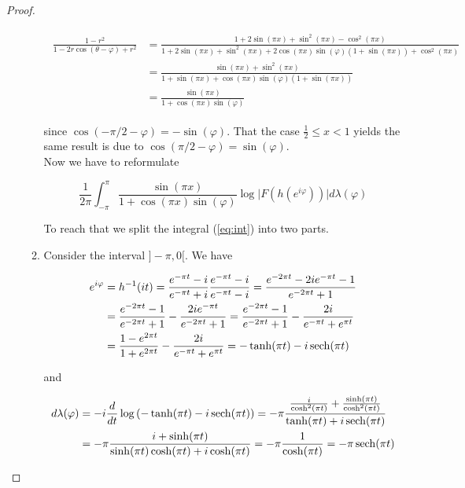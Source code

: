 \begin{proof}
\begin{enumerate}[label = \textbf{(\roman*)}]
\begin{enumerate}[label = \textbf{\alph*.}]
	\begin{gather*}
		\begin{aligned}
			\frac{1 - r^2}{1 - 2r\cos(\theta - \varphi) + r^2} &= \frac{1 + 2\sin(\pi x) + \sin^2(\pi x) - \cos^2(\pi x)}{1 + 2\sin(\pi x) + \sin^2(\pi x) + 2\cos(\pi x)\sin(\varphi)(1 + \sin(\pi x)) + \cos^2(\pi x)}\\
			&= \frac{\sin(\pi x) + \sin^2(\pi x)}{1 + \sin(\pi x) + \cos(\pi x)\sin(\varphi)(1 + \sin(\pi x))}\\
			&= \frac{\sin(\pi x)}{1 + \cos(\pi x)\sin(\varphi)}
		\end{aligned}
	\end{gather*}

	since $\cos\left( -\pi/2 - \varphi \right) = -\sin(\varphi)$. That the case $\frac{1}{2} \leqslant x < 1$ yields the same result is due to $\cos(\pi/2 - \varphi) = \sin(\varphi)$.\\
	Now we have to reformulate 

	\begin{equation}
		\frac{1}{2\pi} \int_{-\pi}^\pi \frac{\sin(\pi x)}{1 + \cos(\pi x)\sin(\varphi)} \log \vert F(h(e^{i\varphi}))\vert d\lambda(\varphi)
		\label{eq:int}
	\end{equation}

	To reach that we split the integral (\ref{eq:int}) into two parts. 

	\item Consider the interval $]-\pi,0[$. We have

				\begin{gather*}
					\begin{aligned}
						e^{i\varphi} &= h^{-1}(it) = \frac{e^{-\pi t} - i}{e^{-\pi t} + i} \frac{e^{-\pi t} - i}{e^{-\pi t} - i} = \frac{e^{-2\pi t} - 2ie^{-\pi t} - 1}{e^{-2\pi t} + 1}\\
						&= \frac{e^{-2\pi t} - 1}{e^{-2\pi t} + 1} - \frac{2ie^{-\pi t}}{e^{-2\pi t} + 1} = \frac{e^{-2\pi t} - 1}{e^{-2\pi t} + 1} - \frac{2i}{e^{-\pi t} + e^{\pi t}}\\
						&= \frac{1 - e^{2\pi t}}{1 + e^{2\pi t}} - \frac{2i}{e^{-\pi t} + e^{\pi t}} = -\tanh (\pi t) - i \operatorname{sech}(\pi t)
					\end{aligned}
				\end{gather*}

				and

				\begin{gather*}
					\begin{aligned}
					d\lambda(\varphi) &= -i\frac{d}{dt}\log\left( -\tanh (\pi t) - i \operatorname{sech}(\pi t) \right) = -\pi\frac{\frac{i}{\cosh^2(\pi t)} + \frac{\sinh(\pi t)}{\cosh^2(\pi t)}}{\tanh (\pi t) + i \operatorname{sech}(\pi t)}\\
						&= -\pi \frac{i + \sinh(\pi t)}{\sinh(\pi t)\cosh(\pi t) + i\cosh(\pi t)} = -\pi \frac{1}{\cosh(\pi t)} = -\pi \operatorname{sech}(\pi t)
					\end{aligned}
				\end{gather*}


\end{enumerate}
\end{enumerate}
\end{proof}
